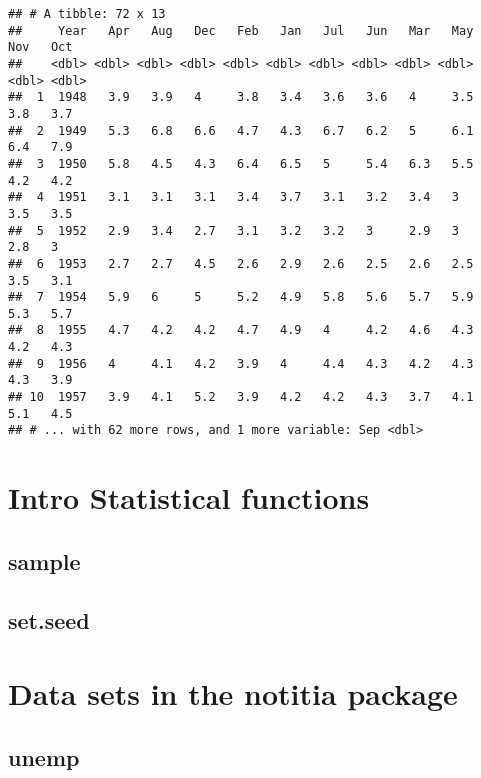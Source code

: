 \documentclass[]{book}
\begin{document}
\begin{verbatim}
## # A tibble: 72 x 13
##     Year   Apr   Aug   Dec   Feb   Jan   Jul   Jun   Mar   May   Nov   Oct
##    <dbl> <dbl> <dbl> <dbl> <dbl> <dbl> <dbl> <dbl> <dbl> <dbl> <dbl> <dbl>
##  1  1948   3.9   3.9   4     3.8   3.4   3.6   3.6   4     3.5   3.8   3.7
##  2  1949   5.3   6.8   6.6   4.7   4.3   6.7   6.2   5     6.1   6.4   7.9
##  3  1950   5.8   4.5   4.3   6.4   6.5   5     5.4   6.3   5.5   4.2   4.2
##  4  1951   3.1   3.1   3.1   3.4   3.7   3.1   3.2   3.4   3     3.5   3.5
##  5  1952   2.9   3.4   2.7   3.1   3.2   3.2   3     2.9   3     2.8   3  
##  6  1953   2.7   2.7   4.5   2.6   2.9   2.6   2.5   2.6   2.5   3.5   3.1
##  7  1954   5.9   6     5     5.2   4.9   5.8   5.6   5.7   5.9   5.3   5.7
##  8  1955   4.7   4.2   4.2   4.7   4.9   4     4.2   4.6   4.3   4.2   4.3
##  9  1956   4     4.1   4.2   3.9   4     4.4   4.3   4.2   4.3   4.3   3.9
## 10  1957   3.9   4.1   5.2   3.9   4.2   4.2   4.3   3.7   4.1   5.1   4.5
## # ... with 62 more rows, and 1 more variable: Sep <dbl>
\end{verbatim}

\hypertarget{intro-statistical-functions}{%
\chapter{Intro Statistical functions}\label{intro-statistical-functions}}

\hypertarget{sample}{%
\section*{\texorpdfstring{\textbf{sample}}{sample}}\label{sample}}

\hypertarget{setseed}{%
\section*{\texorpdfstring{\textbf{set.seed}}{set.seed}}\label{setseed}}

\hypertarget{data-sets-in-the-notitia-package}{%
\chapter{\texorpdfstring{Data sets in the \textbf{notitia} package}{Data sets in the notitia package}}\label{data-sets-in-the-notitia-package}}

\hypertarget{unemp}{%
\section*{unemp}\label{unemp}}
\end{document}
